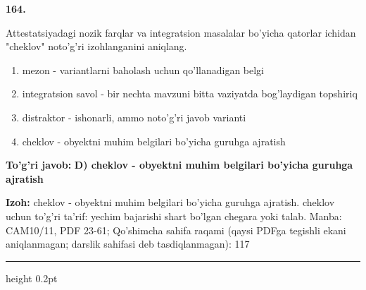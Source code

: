 \documentclass[10pt,a4paper]{article}
\begin{document}
{\bfseries\sffamily\color{ink} 164.}
\par
Attestatsiyadagi nozik farqlar va integratsion masalalar bo'yicha qatorlar ichidan "cheklov" noto'g'ri izohlanganini aniqlang.
\begin{enumerate}[label=\Alph*),leftmargin=9mm]
\item mezon - variantlarni baholash uchun qo'llanadigan belgi
\item integratsion savol - bir nechta mavzuni bitta vaziyatda bog'laydigan topshiriq
\item distraktor - ishonarli, ammo noto'g'ri javob varianti
\item cheklov - obyektni muhim belgilari bo'yicha guruhga ajratish
\end{enumerate}
\begin{tcolorbox}[enhanced,breakable,colback=teal!4,colframe=teal!60!black,boxrule=0.45pt,arc=1.2mm,left=2.7mm,right=2.7mm,top=1.8mm,bottom=1.8mm,before skip=2mm,after skip=2mm]
{\bfseries\sffamily\color{teal}To'g'ri javob:} \textbf{D) cheklov - obyektni muhim belgilari bo'yicha guruhga ajratish}
\par\smallskip
{\bfseries Izoh:} cheklov - obyektni muhim belgilari bo'yicha guruhga ajratish. cheklov uchun to'g'ri ta'rif: yechim bajarishi shart bo'lgan chegara yoki talab. Manba: CAM10/11, PDF 23-61; Qo'shimcha sahifa raqami (qaysi PDFga tegishli ekani aniqlanmagan; darslik sahifasi deb tasdiqlanmagan): 117
\end{tcolorbox}
\vspace{2mm}\hrule height 0.2pt\vspace{3mm}
\end{document}
